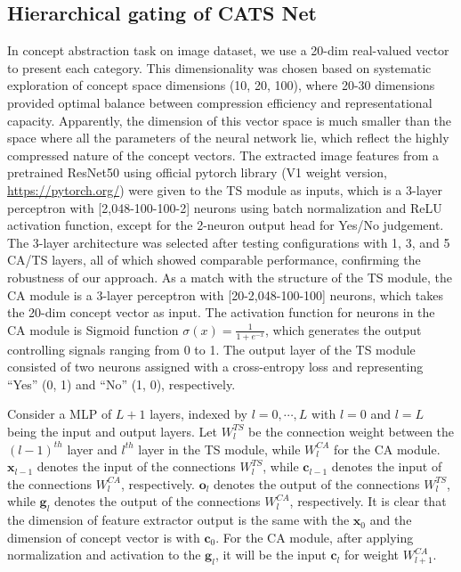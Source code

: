 \documentclass[pdflatex,sn-mathphys-num,lineno]{sn-jnl}%
\begin{document}
\begin{CJK}{UTF8}{gbsn}
\subsection{Hierarchical gating of CATS Net}
In concept abstraction task on image dataset, we use a 20-dim real-valued vector to present each category. This dimensionality was chosen based on systematic exploration of concept space dimensions (10, 20, 100), where 20-30 dimensions provided optimal balance between compression efficiency and representational capacity. Apparently, the dimension of this vector space is much smaller than the space where all the parameters of the neural network lie, which reflect the highly compressed nature of the concept vectors. The extracted image features from a pretrained ResNet50 \cite{he_deep_2016} using official pytorch library (V1 weight version, \url{https://pytorch.org/}) were given to the TS module as inputs, which is a 3-layer perceptron with [2,048-100-100-2] neurons using batch normalization and ReLU activation function, except for the 2-neuron output head for Yes/No judgement. The 3-layer architecture was selected after testing configurations with 1, 3, and 5 CA/TS layers, all of which showed comparable performance, confirming the robustness of our approach. As a match with the structure of the TS module, the CA module is a 3-layer perceptron with [20-2,048-100-100] neurons, which takes the 20-dim concept vector as input. The activation function for neurons in the CA module is Sigmoid function $\sigma(x) = \frac{1}{1 + e^{-x}}$, which generates the output controlling signals ranging from 0 to 1. The output layer of the TS module consisted of two neurons assigned with a cross-entropy loss and representing “Yes” (0, 1) and “No” (1, 0), respectively.

Consider a MLP of $L+1$ layers, indexed by $l=0,\cdots,L$ with $l = 0$ and $l = L$ being the input and output layers. Let $W_l^{TS}$ be the connection weight between the $(l-1)^{th}$ layer and $l^{th}$ layer in the TS module, while $W_l^{CA}$ for the CA module. $\mathbf{x}_{l-1}$ denotes the input of the connections $W_l^{TS}$, while $\mathbf{c}_{l-1}$ denotes the input of the connections $W_l^{CA}$, respectively. $\mathbf{o}_{l}$ denotes the output of the connections $W_l^{TS}$, while $\mathbf{g}_{l}$ denotes the output of the connections $W_l^{CA}$, respectively. It is clear that the dimension of feature extractor output is the same with the $\mathbf{x}_{0}$ and the dimension of concept vector is with $\mathbf{c}_{0}$. For the CA module, after applying normalization and activation to the $\mathbf{g}_{l}$, it will be the input $\mathbf{c}_{l}$ for weight $W_{l+1}^{CA}$.


\end{CJK}
\end{document}
